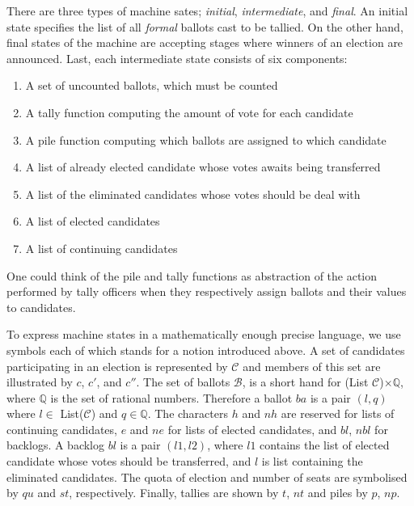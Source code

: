 \documentclass{llncs}
\begin{document}
There are three types of machine sates; \emph{initial}, \emph{intermediate}, and \emph{final}. An initial state specifies the list of all \emph{formal} ballots cast to be tallied. On the other hand, final states of the machine are accepting stages where winners of an election are announced. Last, each intermediate state consists of six components:
\begin{enumerate}
\item A set of uncounted ballots, which must be counted
\item A tally function computing the amount of vote for each candidate
\item A pile function computing which ballots are assigned to which candidate
\item A list of already elected candidate whose votes awaits being transferred
\item A list of the eliminated candidates whose votes should be deal with
\item A list of elected candidates
\item A list of continuing candidates 
\end{enumerate}  
One could think of  the pile and tally functions as abstraction of the action performed by tally officers when they respectively assign ballots and their values to candidates.


To express machine states in a mathematically enough precise language, we use symbols each of which stands for a notion introduced above. A set of candidates participating in an election is represented by $\mathcal{C}$ and members of this set are illustrated by $c$, $c'$, and $c''$. The set of ballots $\mathcal{B}$, is a short hand for (\textsf{List} $\mathcal{C}$)$\times\mathbb{Q}$, where $\mathbb{Q}$ is the set of rational numbers. Therefore a ballot $ba$ is a pair $(l,q)$ where $l\in$ \textsf{List}($\mathcal{C}$) and $q\in\mathbb{Q}$. The characters $h$ and $nh$ are reserved for lists of continuing candidates, $e$ and $ne$ for lists of elected candidates, and $bl$, $nbl$ for backlogs. A backlog $bl$ is a pair $(l1,l2)$, where $l1$ contains the list of elected candidate whose votes should be transferred, and $l$ is list containing the eliminated candidates. The quota of election and number of seats are symbolised by $qu$ and $st$, respectively. Finally, tallies are shown by $t$, $nt$ and piles by $p$, $np$.  
\end{document}
